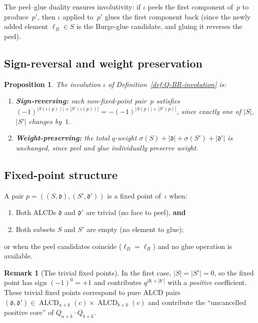 \documentclass[11pt]{article}
\newcommand{\ALCD}{\operatorname{ALCD}}
\theoremstyle{plain}
\newtheorem{proposition}[theorem]{Proposition}
\theoremstyle{definition}
\newtheorem{remark}[theorem]{Remark}
\begin{document}
The peel--glue duality ensures involutivity: if $\iota$ peels
the first component of~$p$ to produce~$p'$, then $\iota$
applied to~$p'$ glues the first component back (since the
newly added element $\ell_B \in S$ is the Burge-glue candidate,
and gluing it reverses the peel).


\subsection{Sign-reversal and weight preservation}

\begin{proposition}\label{prop:sign-weight}
The involution $\iota$ of Definition~\ref{def:Q-BR-involution}
is:
\begin{enumerate}
  \item \textbf{Sign-reversing:} each non-fixed-point pair~$p$
    satisfies
    $(-1)^{|S(\iota(p))| + |S'(\iota(p))|}
    = -(-1)^{|S(p)| + |S'(p)|}$,
    since exactly one of $|S|$, $|S'|$ changes by~$1$.
  \item \textbf{Weight-preserving:} the total $q$-weight
    $\sigma(S) + |\mathfrak{d}| + \sigma(S') + |\mathfrak{d}'|$
    is unchanged, since peel and glue individually preserve
    weight.
\end{enumerate}
\end{proposition}


\subsection{Fixed-point structure}

A pair $p = ((S, \mathfrak{d}), (S', \mathfrak{d}'))$ is a
fixed point of~$\iota$ when:
\begin{enumerate}
  \item Both ALCDs $\mathfrak{d}$ and $\mathfrak{d}'$ are
    trivial (no face to peel), \textbf{and}
  \item Both subsets $S$ and $S'$ are empty (no element to
    glue);
\end{enumerate}
or when the peel candidates coincide ($\ell_B = \ell_R$) and
no glue operation is available.

\begin{remark}[The trivial fixed points]
\label{rem:trivial-fp}
In the first case, $|S| = |S'| = 0$, so the fixed point has
sign $(-1)^0 = +1$ and contributes
$q^{|\mathfrak{d}| + |\mathfrak{d}'|}$ with a \emph{positive}
coefficient.  These trivial fixed points correspond to pure
ALCD pairs
$(\mathfrak{d}, \mathfrak{d}') \in \ALCD_{a+k}(c) \times
\ALCD_{b+k}(c)$ and contribute the ``uncancelled positive
core'' of $Q_{a+k} \cdot Q_{b+k}$.
\end{remark}
\end{document}
